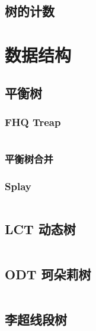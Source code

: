 \documentclass[10pt, a4paper, oneside]{ctexart}
\begin{document}
\begin{multicols}{2}
        \subsection{树的计数}
        
        \newpage

        \section{数据结构}
        \subsection{平衡树}
        \subsubsection{FHQ Treap}
        \inputminted{cpp}{src/data structure/fhq.cpp}
        \subsubsection{平衡树合并}
        
        \subsubsection{Splay}
        \inputminted{cpp}{src/data structure/splay.cpp}
        \subsection{LCT 动态树}
        \inputminted{cpp}{src/data structure/LCT.cpp}
        \subsection{ODT 珂朵莉树}
        \inputminted{cpp}{src/data structure/ODT.cpp}
        \subsection{李超线段树}
        

\end{multicols}
\end{document}
